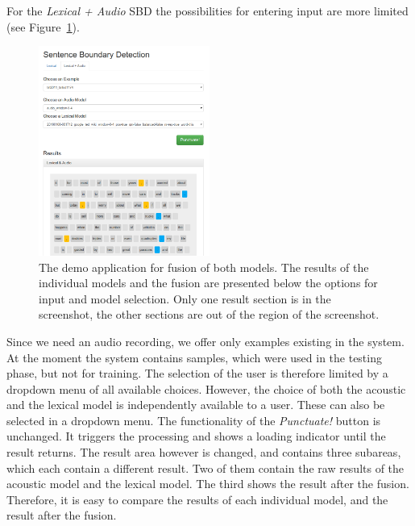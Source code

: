 For the \emph{Lexical + Audio} SBD the possibilities for entering input are more limited (see Figure~\ref{fig:demo_la}).
\begin{figure}[ht]
    \centering
    \includegraphics[width=0.5\textwidth]{img/demo_l_a.png}
    \caption{The demo application for fusion of both models. The results of the individual models and the fusion are presented below the options for input and model selection. Only one result section is in the screenshot, the other sections are out of the region of the screenshot.}
    \label{fig:demo_la}
\end{figure}
Since we need an audio recording, we offer only examples existing in the system.
At the moment the system contains samples, which were used in the testing phase, but not for training.
The selection of the user is therefore limited by a dropdown menu of all available choices.
However, the choice of both the acoustic and the lexical model is independently available to a user.
These can also be selected in a dropdown menu.
The functionality of the \emph{Punctuate!} button is unchanged.
It triggers the processing and shows a loading indicator until the result returns.
The result area however is changed, and contains three subareas, which each contain a different result.
Two of them contain the raw results of the acoustic model and the lexical model.
The third shows the result after the fusion.
Therefore, it is easy to compare the results of each individual model, and the result after the fusion.